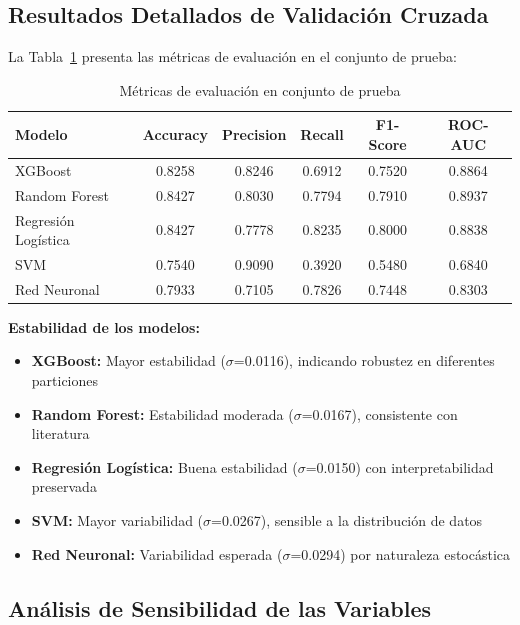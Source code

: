 \documentclass[conference]{IEEEtran}
\begin{document}
\subsection{Resultados Detallados de Validación Cruzada}

La Tabla~\ref{tab:model_results} presenta las métricas de evaluación en el conjunto de prueba:

\begin{table}[htbp]
\centering
\caption{Métricas de evaluación en conjunto de prueba}
\label{tab:model_results}
\begin{tabular}{|p{1cm}|c|c|c|c|c|}
\hline
\textbf{Modelo} & \textbf{Accuracy} & \textbf{Precision} & \textbf{Recall} & \textbf{F1-Score} & \textbf{ROC-AUC} \\
\hline
XGBoost & 0.8258 & 0.8246 & 0.6912 & 0.7520 & 0.8864 \\
\hline
Random Forest & 0.8427 & 0.8030 & 0.7794 & 0.7910 & 0.8937 \\
\hline
Regresión Logística & 0.8427 & 0.7778 & 0.8235 & 0.8000 & 0.8838 \\
\hline
SVM & 0.7540 & 0.9090 & 0.3920 & 0.5480 & 0.6840 \\
\hline
Red Neuronal & 0.7933 & 0.7105 & 0.7826 & 0.7448 & 0.8303 \\
\hline
\end{tabular}
\end{table}

\textbf{Estabilidad de los modelos:}
\begin{itemize}
    \item \textbf{XGBoost:} Mayor estabilidad ($\sigma$=0.0116), indicando robustez en diferentes particiones
    \item \textbf{Random Forest:} Estabilidad moderada ($\sigma$=0.0167), consistente con literatura
    \item \textbf{Regresión Logística:} Buena estabilidad ($\sigma$=0.0150) con interpretabilidad preservada
    \item \textbf{SVM:} Mayor variabilidad ($\sigma$=0.0267), sensible a la distribución de datos
    \item \textbf{Red Neuronal:} Variabilidad esperada ($\sigma$=0.0294) por naturaleza estocástica
\end{itemize}

\subsection{Análisis de Sensibilidad de las Variables}
\end{document}
